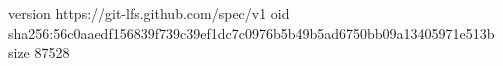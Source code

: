 version https://git-lfs.github.com/spec/v1
oid sha256:56c0aaedf156839f739c39ef1dc7c0976b5b49b5ad6750bb09a13405971e513b
size 87528

